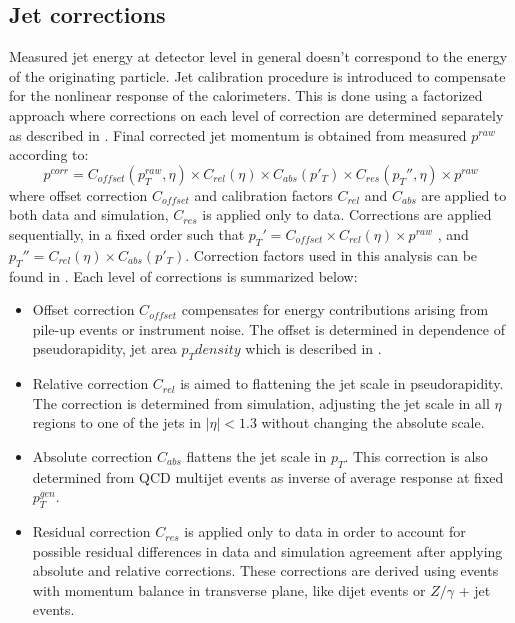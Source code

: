 
\subsection{Jet corrections}
\label{sec:jetCorr}

Measured jet energy at detector level in general doesn't correspond to the energy of the originating particle. Jet calibration procedure is introduced to compensate for the nonlinear response of the calorimeters. This is done using a factorized approach where corrections on each level of correction are determined separately as described in \cite{Chatrchyan:2011ds}. Final corrected jet momentum is obtained from measured $p^{raw}$ according to:
\begin{equation}
p^{corr} = C_{offset}(p_T^{raw},\eta)\times C_{rel}(\eta) \times C_{abs}(p'_T) \times C_{res}(p_T'',\eta) \times p^{raw}
\end{equation}     
where offset correction $C_{offset}$ and calibration factors $C_{rel}$ and $C_{abs}$ are applied to both data and simulation, $C_{res}$ is applied only to data. Corrections are applied sequentially, in a fixed order such that $p_T' = C_{offset} \times C_{rel}(\eta) \times p^{raw}$ , and $p_T'' = C_{rel}(\eta) \times C_{abs}(p'_T)$. Correction factors used in this analysis can be found in \cite{CMS-DP-2013-033}.
Each level of corrections is summarized below:
\begin{itemize}
\item Offset correction $C_{offset}$ compensates for energy contributions arising from pile-up events or instrument noise. The offset is determined in dependence of pseudorapidity, jet area $p_T density$ which is described in \cite{Cacciari2008119}.
\item Relative correction $C_{rel}$ is aimed to flattening the jet scale in pseudorapidity. The correction is determined from simulation, adjusting the jet scale in all $\eta$ regions to one of the jets in $|\eta|<1.3$ without changing the absolute scale.
\item Absolute correction $C_{abs}$ flattens the jet scale in $p_T$. This correction is also determined from QCD multijet events as inverse of average response at fixed $p_T^{gen}$.
\item Residual correction $C_{res}$ is applied only to data in order to account for possible residual differences in data and simulation agreement after applying absolute and relative corrections. These corrections are derived using events with momentum balance in transverse plane, like dijet events or $Z/\gamma$ + jet events.
\end{itemize}
